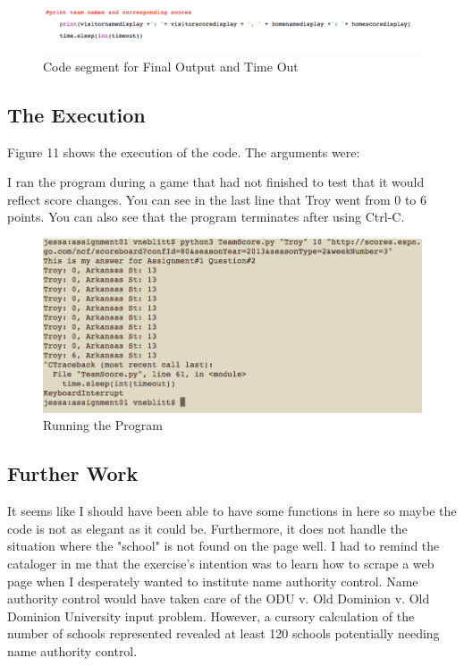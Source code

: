 \documentclass{article}
\begin{document}
\begin{figure}[H]
\centering
\includegraphics[scale=0.40]{printandend}
\caption{Code segment for Final Output and Time Out}
\end{figure}

\subsection*{The Execution}

Figure 11 shows the execution of the code. The arguments were:


I ran the program during a game that had not finished to test that it would reflect score changes. You can see in the last line that Troy went from 0 to 6 points. You can also see that the program terminates after using Ctrl-C.

\begin{figure}[H]
\centering
\includegraphics[scale=0.40]{endingOutput}
\caption{Running the Program}
\end{figure}

\subsection*{Further Work}
It seems like I should have been able to have some functions in here so maybe the code is not as elegant as it could be. Furthermore, it does not handle the situation where the "school" is not found on the page well. I had to remind the cataloger in me that the exercise's intention was to learn how to scrape a web page when I desperately wanted to institute name authority control. Name authority control would have taken care of the ODU v. Old Dominion v. Old Dominion University input problem. However, a cursory calculation of the number of schools represented revealed at least 120 schools potentially needing name authority control.
\end{document}
